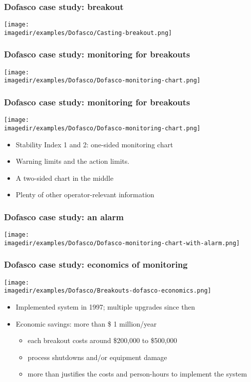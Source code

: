 \begin{frame}\frametitle{Dofasco case study: breakout}

	\texttt{[image: \\imagedir/examples/Dofasco/Casting-breakout.png]}
\end{frame}

\begin{frame}\frametitle{Dofasco case study: monitoring for breakouts}

	\texttt{[image: \\imagedir/examples/Dofasco/Dofasco-monitoring-chart.png]}
\end{frame}

\begin{frame}\frametitle{Dofasco case study: monitoring for breakouts}
	\begin{center}
		\texttt{[image: \\imagedir/examples/Dofasco/Dofasco-monitoring-chart.png]}
	\end{center}
	\begin{itemize}
		\item	Stability Index 1 and 2: one-sided monitoring chart
		\item	Warning limits and the action limits.
		\item	A two-sided chart in the middle
		\item	Plenty of other operator-relevant information
	\end{itemize}
\end{frame}

\begin{frame}\frametitle{Dofasco case study: an alarm}

	\texttt{[image: \\imagedir/examples/Dofasco/Dofasco-monitoring-chart-with-alarm.png]}
\end{frame}

\begin{frame}\frametitle{Dofasco case study: economics of monitoring}

	\texttt{[image: \\imagedir/examples/Dofasco/Breakouts-dofasco-economics.png]}
	\begin{itemize}
		\item	Implemented system in 1997; multiple upgrades since then
		\item	Economic savings: more than \$ 1 million/year
		\begin{itemize}
			\item	each breakout costs around \$200,000 to \$500,000
			\item	process shutdowns and/or equipment damage
			\item	more than justifies the costs and person-hours to implement the system
		\end{itemize}
	\end{itemize}
\end{frame}

